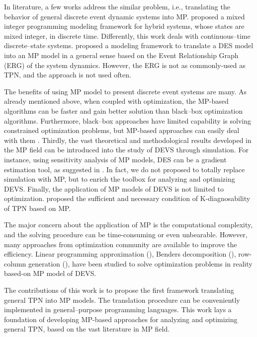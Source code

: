 \documentclass[suppldata]{interact}
\theoremstyle{plain}
\theoremstyle{definition}
\theoremstyle{remark}
\begin{document}
In literature, a few works address the similar problem, i.e.,  translating the behavior of general discrete event dynamic systems into MP. \cite{bemporad1999control} proposed a mixed integer programming modeling framework for hybrid systems, whose states are mixed integer, in discrete time. Differently, this work deals with continuous--time discrete--state systems. \cite{chan2008optimization} proposed a modeling framework to translate a DES model into an MP model in a general sense based on the Event Relationship Graph (ERG) of the system dynamics. However, the ERG is not as commonly-used as TPN, and the approach is not used often.


The benefits of using MP model to present discrete event systems are many. As already mentioned above, when coupled with optimization, the MP-based algorithms can be faster and gain better solution than black--box optimization algorithms. Furthermore, black--box approaches have limited capability is solving constrained optimization problems, but MP-based approaches can easily deal with them \cite{zhang2020models}. Thirdly, the vast theoretical and methodological results developed in the MP field can be introduced into the study of DEVS through simulation. For instance, using sensitivity analysis of MP models, DES can be a gradient estimation tool, as suggested in \cite{chan2008optimization}. In fact, we do not proposed to totally replace simulation with MP, but to enrich the toolbox for analyzing and optimizing DEVS. Finally, the application of MP models of DEVS is not limited to optimization. \cite{basile2012k} proposed the sufficient and necessary condition of K-diagnosability of TPN based on MP. 


The major concern about the application of MP is the computational complexity, and the solving procedure can be time-consuming or even unbearable. However, many approaches from optimization community are available to improve the efficiency. Linear programming approximation (\cite{alfieri2012mathematical}), Benders decomposition (\cite{weiss2015buffer}), row-column generation (\cite{alfieri2020time}), have been studied to solve optimization problems in reality based-on MP model of DEVS.


The contributions of this work is to propose the first framework translating general TPN into MP models. The translation procedure can be conveniently implemented in general--purpose programming languages. This work lays a foundation of developing MP-based approaches for analyzing and optimizing general TPN, based on the vast literature in MP field. 
\end{document}
